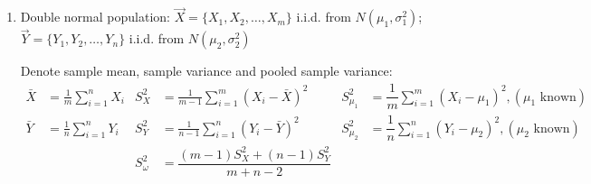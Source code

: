 \begin{enumerate}




    \item Double normal population: $\vec{X}=\{X_1,X_2,\ldots,X_m\}$ i.i.d. from $N(\mu_1,\sigma_1^2)$; $\vec{Y}=\{Y_1,Y_2,\ldots,Y_n\}$ i.i.d. from $N(\mu_2,\sigma^2_2)$

    
    Denote sample mean, sample variance and pooled sample variance:
\begin{align}
    \bar{X}&=\frac{1}{m}\sum_{i=1}^nX_i &S_X^2&=\frac{1}{m-1}\sum_{i=1}^m(X_i-\bar{X})^2& S_{\mu_1}^2 &=\dfrac{1}{m}\sum_{i=1}^m(X_i-\mu_1)^2,(\mu_1\text{ known}) \\\bar{Y}&=\frac{1}{n}\sum_{i=1}^n Y_i&S^2_Y&=\frac{1}{n-1}\sum_{i=1}^n(Y_i-\bar{Y})^2& S_{\mu_2}^2 &=\dfrac{1}{n}\sum_{i=1}^n(Y_i-\mu_2)^2,(\mu_2\text{ known})\\
    &&S_\omega^2&=\dfrac{(m-1)S_X^2+(n-1)S_Y^2}{m+n-2}&&
\end{align}




\end{enumerate}
